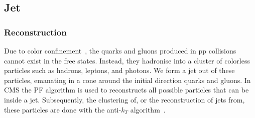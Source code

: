 \subsection{Jet}
\label{s:jet_reco}
\subsubsection{Reconstruction}
Due to color confinement~\cite{Polyakov:1976fu}, the quarks and gluons produced in pp collisions cannot exist in the free states.
Instead, they hadronise into a cluster of colorless particles such as hadrons, leptons, and photons.
We form a jet out of these particles, emanating in a cone around the initial direction quarks and gluons.
In CMS the PF algorithm is used to reconstructs all possible particles that can be inside a jet.
Subsequently, the clustering of, or the reconstruction of jets from, these particles are done with the
anti-$k_T$ algorithm~\cite{Cacciari:2008gp}. 

